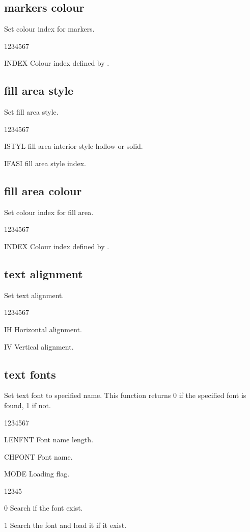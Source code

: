 \subsection{ markers colour}
%
\Action
Set colour index for markers.
\Pdesc
\begin{DLtt}{1234567}
\item[INDEX] Colour index defined by .
\end{DLtt}
\subsection{ fill area style}
%
\Action
Set fill area style.
\Pdesc
\begin{DLtt}{1234567}
\item[ISTYL] fill area interior style hollow or solid.
\item[IFASI] fill area style index.
\end{DLtt}
\subsection{ fill area colour}
%
\Action
Set colour index for fill area.
\Pdesc
\begin{DLtt}{1234567}
\item[INDEX] Colour index defined by .
\end{DLtt}

\newpage%

\subsection{ text alignment}
%
\Action
Set text alignment.
\Pdesc
\begin{DLtt}{1234567}
\item[IH] Horizontal alignment.
\item[IV] Vertical alignment.
\end{DLtt}
\subsection{ text fonts}
%
\Action
Set text font to specified name. This function returns 0 if
the specified font is found, 1 if not.
\Pdesc
\begin{DLtt}{1234567}
\item[LENFNT] Font name length.
\item[CHFONT] Font name.
\item[MODE] Loading flag.
\begin{DLtt}{12345}
\item[0] Search if the font exist.
\item[1] Search the font and load it if it exist.
\end{DLtt}
\end{DLtt}
